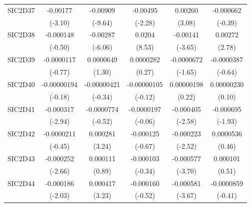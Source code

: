 \begin{table}[htbp]
\begin{tabular}{l*{5}{c}}
SIC2D37     &    -0.00177\sym{**} &    -0.00909\sym{***}&    -0.00495\sym{*}  &     0.00260\sym{**} &   -0.000662         \\
            &     (-3.10)         &     (-9.64)         &     (-2.28)         &      (3.08)         &     (-0.39)         \\
SIC2D38     &   -0.000148         &    -0.00287\sym{***}&      0.0204\sym{***}&    -0.00141\sym{***}&     0.00272\sym{**} \\
            &     (-0.50)         &     (-6.06)         &      (8.53)         &     (-3.65)         &      (2.78)         \\
SIC2D39     &  -0.0000117         &   0.0000649         &   0.0000282         &  -0.0000672         &  -0.0000387         \\
            &     (-0.77)         &      (1.30)         &      (0.27)         &     (-1.65)         &     (-0.64)         \\
SIC2D40     & -0.00000194         & -0.00000421         & -0.00000105         &  0.00000198         &  0.00000230         \\
            &     (-0.18)         &     (-0.34)         &     (-0.12)         &      (0.22)         &      (0.10)         \\
SIC2D41     &   -0.000317\sym{**} &  -0.0000774         &  -0.0000197         &   -0.000405\sym{**} &   -0.000695         \\
            &     (-2.94)         &     (-0.52)         &     (-0.06)         &     (-2.58)         &     (-1.93)         \\
SIC2D42     &  -0.0000211         &    0.000281\sym{**} &   -0.000125         &   -0.000223\sym{*}  &   0.0000536         \\
            &     (-0.45)         &      (3.24)         &     (-0.67)         &     (-2.52)         &      (0.46)         \\
SIC2D43     &   -0.000252\sym{**} &    0.000111         &   -0.000103         &   -0.000577\sym{***}&    0.000101         \\
            &     (-2.66)         &      (0.89)         &     (-0.34)         &     (-3.70)         &      (0.51)         \\
SIC2D44     &   -0.000186\sym{*}  &    0.000417\sym{**} &   -0.000160         &   -0.000581\sym{***}&  -0.0000859         \\
            &     (-2.03)         &      (3.23)         &     (-0.52)         &     (-3.67)         &     (-0.41)         \\

\end{tabular}
\end{table}
